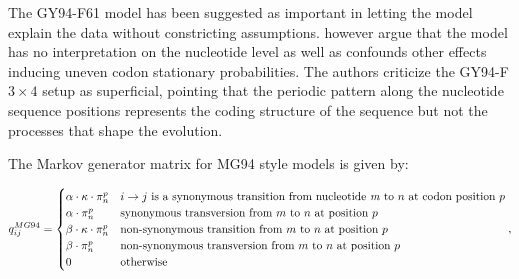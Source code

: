 The GY94-F61 model has been suggested as important in letting the model explain the data without constricting assumptions.
\citet{Rodrigue2008} however argue that the model has no interpretation on the nucleotide level as well as confounds other effects inducing uneven codon stationary probabilities.
The authors criticize the GY94-F$3\times4$ setup as superficial, pointing that the periodic pattern along the nucleotide sequence positions represents the coding structure of the sequence but not the processes that shape the evolution.

The Markov generator matrix for MG94 style models \citep{Muse1994} is given by:

{\tiny{
\begin{equation}
q_{ij}^{MG94}=\begin{cases}
\alpha\cdot\kappa\cdot\pi_{n}^{p} & i\rightarrow j\text{ is a synonymous transition from nucleotide \textit{m} to \ensuremath{n} at codon position \ensuremath{p}}\\
\alpha\cdot\pi_{n}^{p} & \text{synonymous transversion from \ensuremath{m} to \ensuremath{n} at position \ensuremath{p}}\\
\beta\cdot\kappa\cdot\pi_{n}^{p} & \text{non-synonymous transition from \ensuremath{m} to \ensuremath{n} at position \ensuremath{p}}\\
\beta\cdot\pi_{n}^{p} & \text{non-synonymous transversion from \ensuremath{m} to \ensuremath{n} at position \ensuremath{p}}\\
0 & \text{otherwise}
\end{cases},
\label{eq:mg94}
\end{equation}
} %
}


